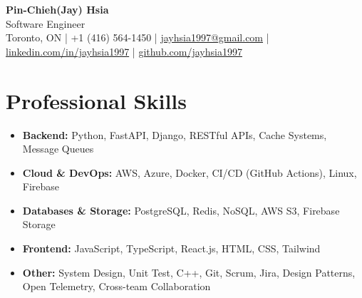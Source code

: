 \documentclass[letterpaper,11pt]{article}
\let\hrefWithoutArrow\href
\renewcommand{\href}[2]{
  \hrefWithoutArrow{#1}{
    \ifthenelse{\equal{#2}{}}{ }{#2\ }
    \raisebox{.15ex}{\footnotesize \faExternalLink*}
  }
}
\newcommand{\resumeItemNH}[1]{
  \item\small{
    {#1 \vspace{0pt}}
  }
}
\newcommand{\resumeItemListStart}{\begin{itemize}[leftmargin=*]}
\newcommand{\resumeItemListEnd}{\end{itemize}}
\begin{document}
\begin{center}
{\LARGE \textbf{Pin-Chieh(Jay) Hsia}}\\[0.25em]
{Software Engineer}\\[0.1em]
\small Toronto, ON | +1 (416) 564-1450 |
\hrefWithoutArrow{mailto:jayhsia1997@gmail.com}{jayhsia1997@gmail.com} |
\hrefWithoutArrow{https://www.linkedin.com/in/jayhsia1997/}{linkedin.com/in/jayhsia1997} |
\hrefWithoutArrow{https://github.com/jayhsia1997}{github.com/jayhsia1997}
\\[0.4em]
\end{center}


\section*{Professional Skills}
  \resumeItemListStart
    \resumeItemNH{\textbf{Backend:} Python, FastAPI, Django, RESTful APIs, Cache Systems, Message Queues}
    \resumeItemNH{\textbf{Cloud \& DevOps:} AWS, Azure, Docker, CI/CD (GitHub Actions), Linux, Firebase}
    \resumeItemNH{\textbf{Databases \& Storage:} PostgreSQL, Redis, NoSQL, AWS S3, Firebase Storage}
    \resumeItemNH{\textbf{Frontend:} JavaScript, TypeScript, React.js, HTML, CSS, Tailwind}
    \resumeItemNH{\textbf{Other:} System Design, Unit Test, C++, Git, Scrum, Jira, Design Patterns, Open Telemetry, Cross-team Collaboration}
  \resumeItemListEnd

\end{document}
